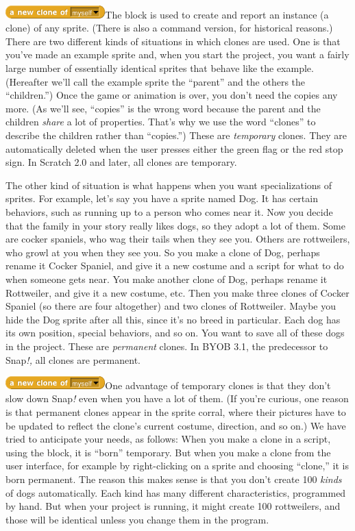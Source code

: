 \includegraphics[width=1.51389in,height=0.19444in]{media/image748.png}The
block is used to create and report an instance (a clone) of any sprite.
(There is also a command version, for historical reasons.) There are two
different kinds of situations in which clones are used. One is that
you've made an example sprite and, when you start the project, you want
a fairly large number of essentially identical sprites that behave like
the example. (Hereafter we'll call the example sprite the ``parent'' and
the others the ``children.'') Once the game or animation is over, you
don't need the copies any more. (As we'll see, ``copies'' is the wrong
word because the parent and the children \emph{share} a lot of
properties. That's why we use the word ``clones'' to describe the
children rather than ``copies.'') These are \emph{temporary} clones.
They are automatically deleted when the user presses either the green
flag or the red stop sign. In Scratch 2.0 and later, all clones are
temporary.

The other kind of situation is what happens when you want
specializations of sprites. For example, let's say you have a sprite
named Dog. It has certain behaviors, such as running up to a person who
comes near it. Now you decide that the family in your story really likes
dogs, so they adopt a lot of them. Some are cocker spaniels, who wag
their tails when they see you. Others are rottweilers, who growl at you
when they see you. So you make a clone of Dog, perhaps rename it Cocker
Spaniel, and give it a new costume and a script for what to do when
someone gets near. You make another clone of Dog, perhaps rename it
Rottweiler, and give it a new costume, etc. Then you make three clones
of Cocker Spaniel (so there are four altogether) and two clones of
Rottweiler. Maybe you hide the Dog sprite after all this, since it's no
breed in particular. Each dog has its own position, special behaviors,
and so on. You want to save all of these dogs in the project. These are
\emph{permanent} clones. In BYOB 3.1, the predecessor to Snap\emph{!,}
all clones are permanent.

\includegraphics[width=1.51389in,height=0.19444in]{media/image748.png}One
advantage of temporary clones is that they don't slow down Snap\emph{!}
even when you have a lot of them. (If you're curious, one reason is that
permanent clones appear in the sprite corral, where their pictures have
to be updated to reflect the clone's current costume, direction, and so
on.) We have tried to anticipate your needs, as follows: When you make a
clone in a script, using the block, it is ``born'' temporary. But when
you make a clone from the user interface, for example by right-clicking
on a sprite and choosing ``clone,'' it is born permanent. The reason
this makes sense is that you don't create 100 \emph{kinds} of dogs
automatically. Each kind has many different characteristics, programmed
by hand. But when your project is running, it might create 100
rottweilers, and those will be identical unless you change them in the
program.

